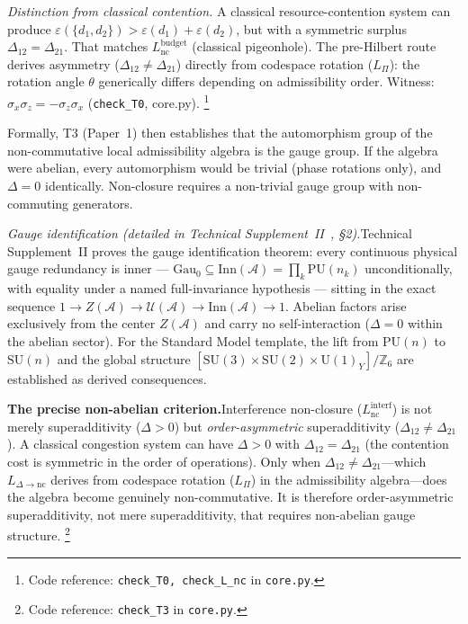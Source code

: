 \documentclass[11pt]{article}
\newcommand{\coderef}[2]{\footnote{Code reference: \texttt{#1} in \texttt{#2}.}}
\newcommand{\SU}{\mathrm{SU}}
\newcommand{\U}{\mathrm{U}}
\begin{document}
\begin{tcolorbox}[apfbox, title={Lemma $L_{\Delta\to\mathrm{nc}}$ (Interference Non-Closure Implies Non-Commutativity)}]
\smallskip\noindent\textit{Distinction from classical contention.}  A classical resource-contention system can produce $\varepsilon(\{d_1,d_2\}) > \varepsilon(d_1) + \varepsilon(d_2)$, but with a symmetric surplus $\Delta_{12} = \Delta_{21}$.  That matches $L_{\mathrm{nc}}^{\mathrm{budget}}$ (classical pigeonhole).  The pre-Hilbert route derives asymmetry ($\Delta_{12} \ne \Delta_{21}$) directly from codespace rotation ($L_\Pi$): the rotation angle $\theta$ generically differs depending on admissibility order.  Witness: $\sigma_x \sigma_z = -\sigma_z \sigma_x$ (\texttt{check\_T0}, core.py).
\coderef{check\_T0, check\_L\_nc}{core.py}
\end{tcolorbox}

Formally, T3 (Paper~1) then establishes that the automorphism group of the non-commutative local admissibility algebra is the gauge group.  If the algebra were abelian, every automorphism would be trivial (phase rotations only), and $\Delta = 0$ identically.  Non-closure requires a non-trivial gauge group with non-commuting generators.

\smallskip\noindent\textit{Gauge identification (detailed in Technical Supplement~II~\cite{BrookeP2FoundSupplement}, \S2).}\quad Technical Supplement~II proves the gauge identification theorem: every continuous physical gauge redundancy is inner --- $\mathrm{Gau}_0 \subseteq \mathrm{Inn}(\mathcal{A}) = \prod_k \mathrm{PU}(n_k)$ unconditionally, with equality under a named full-invariance hypothesis --- sitting in the exact sequence $1 \to Z(\mathcal{A}) \to \mathcal{U}(\mathcal{A}) \to \mathrm{Inn}(\mathcal{A}) \to 1$.  Abelian factors arise exclusively from the center $Z(\mathcal{A})$ and carry no self-interaction ($\Delta = 0$ within the abelian sector).  For the Standard Model template, the lift from $\mathrm{PU}(n)$ to $\SU(n)$ and the global structure $[\SU(3) \times \SU(2) \times \U(1)_Y]/\mathbb{Z}_6$ are established as derived consequences.

\smallskip
\noindent\textbf{The precise non-abelian criterion.}\quad Interference non-closure ($L_{\mathrm{nc}}^{\mathrm{interf}}$) is not merely superadditivity ($\Delta > 0$) but \emph{order-asymmetric} superadditivity ($\Delta_{12} \ne \Delta_{21}$).  A classical congestion system can have $\Delta > 0$ with $\Delta_{12} = \Delta_{21}$ (the contention cost is symmetric in the order of operations).  Only when $\Delta_{12} \ne \Delta_{21}$---which $L_{\Delta\to\mathrm{nc}}$ derives from codespace rotation ($L_\Pi$) in the admissibility algebra---does the algebra become genuinely non-commutative.  It is therefore order-asymmetric superadditivity, not mere superadditivity, that requires non-abelian gauge structure.
\coderef{check\_T3}{core.py}
\end{document}

